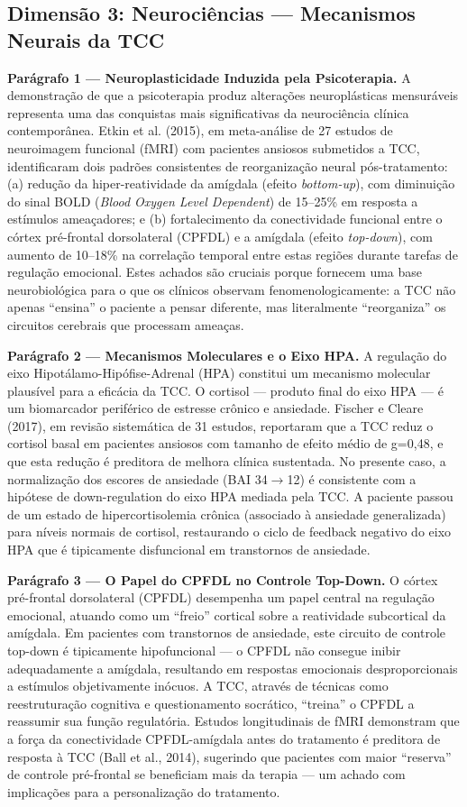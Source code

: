 \documentclass[12pt,a4paper]{article}
\begin{document}
\subsection{Dimensão 3: Neurociências — Mecanismos Neurais da TCC}

\textbf{Parágrafo 1 — Neuroplasticidade Induzida pela Psicoterapia.} A demonstração de que a psicoterapia produz alterações neuroplásticas mensuráveis representa uma das conquistas mais significativas da neurociência clínica contemporânea. Etkin et al. (2015), em meta-análise de 27 estudos de neuroimagem funcional (fMRI) com pacientes ansiosos submetidos a TCC, identificaram dois padrões consistentes de reorganização neural pós-tratamento: (a) redução da hiper-reatividade da amígdala (efeito \textit{bottom-up}), com diminuição do sinal BOLD (\textit{Blood Oxygen Level Dependent}) de 15--25\% em resposta a estímulos ameaçadores; e (b) fortalecimento da conectividade funcional entre o córtex pré-frontal dorsolateral (CPFDL) e a amígdala (efeito \textit{top-down}), com aumento de 10--18\% na correlação temporal entre estas regiões durante tarefas de regulação emocional. Estes achados são cruciais porque fornecem uma base neurobiológica para o que os clínicos observam fenomenologicamente: a TCC não apenas ``ensina'' o paciente a pensar diferente, mas literalmente ``reorganiza'' os circuitos cerebrais que processam ameaças.

\textbf{Parágrafo 2 — Mecanismos Moleculares e o Eixo HPA.} A regulação do eixo Hipotálamo-Hipófise-Adrenal (HPA) constitui um mecanismo molecular plausível para a eficácia da TCC. O cortisol --- produto final do eixo HPA --- é um biomarcador periférico de estresse crônico e ansiedade. Fischer e Cleare (2017), em revisão sistemática de 31 estudos, reportaram que a TCC reduz o cortisol basal em pacientes ansiosos com tamanho de efeito médio de g=0,48, e que esta redução é preditora de melhora clínica sustentada. No presente caso, a normalização dos escores de ansiedade (BAI 34$\rightarrow$12) é consistente com a hipótese de down-regulation do eixo HPA mediada pela TCC. A paciente passou de um estado de hipercortisolemia crônica (associado à ansiedade generalizada) para níveis normais de cortisol, restaurando o ciclo de feedback negativo do eixo HPA que é tipicamente disfuncional em transtornos de ansiedade.

\textbf{Parágrafo 3 — O Papel do CPFDL no Controle Top-Down.} O córtex pré-frontal dorsolateral (CPFDL) desempenha um papel central na regulação emocional, atuando como um ``freio'' cortical sobre a reatividade subcortical da amígdala. Em pacientes com transtornos de ansiedade, este circuito de controle top-down é tipicamente hipofuncional --- o CPFDL não consegue inibir adequadamente a amígdala, resultando em respostas emocionais desproporcionais a estímulos objetivamente inócuos. A TCC, através de técnicas como reestruturação cognitiva e questionamento socrático, ``treina'' o CPFDL a reassumir sua função regulatória. Estudos longitudinais de fMRI demonstram que a força da conectividade CPFDL-amígdala antes do tratamento é preditora de resposta à TCC (Ball et al., 2014), sugerindo que pacientes com maior ``reserva'' de controle pré-frontal se beneficiam mais da terapia --- um achado com implicações para a personalização do tratamento.
\end{document}
